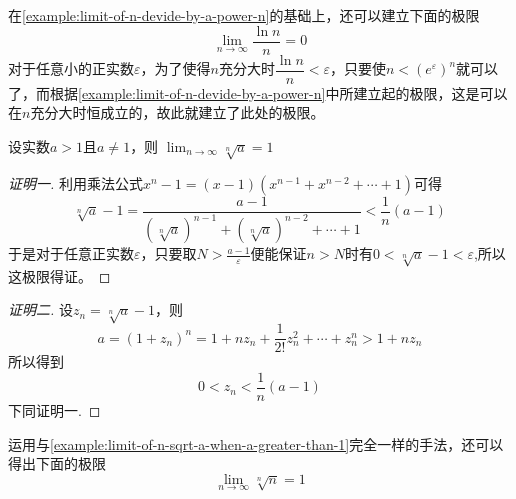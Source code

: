 \begin{example}
  \label{example:limit-of-lnn-devide-by-n}
  在\autoref{example:limit-of-n-devide-by-a-power-n}的基础上，还可以建立下面的极限
  \[ \lim_{n \to \infty} \frac{\ln{n}}{n} = 0 \]
  对于任意小的正实数$\varepsilon$，为了使得$n$充分大时$\dfrac{\ln{n}}{n} < \varepsilon$，只要使$n<(e^{\varepsilon})^n$就可以了，而根据\autoref{example:limit-of-n-devide-by-a-power-n}中所建立起的极限，这是可以在$n$充分大时恒成立的，故此就建立了此处的极限。
\end{example}

\begin{example}
  \label{example:limit-of-n-sqrt-a-when-a-greater-than-1}
  设实数$a>1$且$a \neq 1$，则 $\lim_{n \to \infty} \sqrt[n]{a} = 1$

  \begin{proof}[证明一]
    利用乘法公式$x^n-1=(x-1)(x^{n-1}+x^{n-2}+\cdots+1)$可得
    \[ \sqrt[n]{a}-1 = \frac{a-1}{(\sqrt[n]{a})^{n-1}+(\sqrt[n]{a})^{n-2}+\cdots+1} < \frac{1}{n}(a-1) \]
   于是对于任意正实数$\varepsilon$，只要取$N>\frac{a-1}{\varepsilon}$便能保证$n>N$时有$0<\sqrt[n]{a}-1<\varepsilon$,所以这极限得证。
  \end{proof}

  \begin{proof}[证明二]
    设$z_n=\sqrt[n]{a}-1$，则
    \[ a = (1+z_n)^n = 1+ nz_n+\frac{1}{2!}z_n^2+\cdots+z_n^n > 1+ n z_n \]
    所以得到
    \[ 0<z_n<\frac{1}{n}(a-1) \]
    下同证明一.
  \end{proof}
\end{example}

\begin{example}
  运用与\autoref{example:limit-of-n-sqrt-a-when-a-greater-than-1}完全一样的手法，还可以得出下面的极限
  \[ \lim_{n \to \infty} \sqrt[n]{n} = 1 \]
\end{example}

